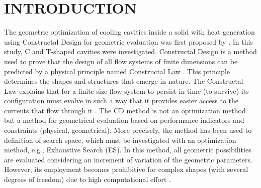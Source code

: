 \documentclass[12pt,fleqn]{article}
\begin{document}
\section{INTRODUCTION}
The geometric optimization of cooling cavities inside a solid with heat generation using Constructal Design for geometric evaluation was first proposed by \cite{Biserni2004}. In this study, C and T-shaped cavities were investigated. Constructal Design is a method used to prove that the design of all flow systems of finite dimensions can be predicted by a physical principle named Constructal Law \citep{Bejan}. This principle determines the shapes and structures that emerge in nature. The Constructal Law explains that for a finite-size flow system to persist in time (to survive) its configuration must evolve in such a way that it provides easier access to the currents that flow through it \citep{Bejan}. The CD method is not an optimization method but a method for geometrical evaluation based on performance indicators and constraints (physical, geometrical). More precisely, the method has been used to definition of search space, which must be investigated with an optimization method, e.g., Exhaustive Search (ES).  In this method, all geometric possibilities are evaluated considering an increment of variation of the geometric parameters. However, its employment becomes prohibitive for complex shapes (with several degrees of freedom) due to high computational effort \citep{Gonzales2015a}.
\end{document}
